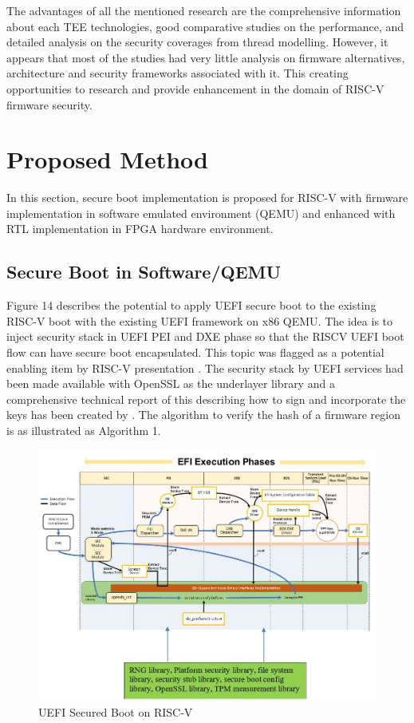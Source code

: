 \documentclass[review]{elsarticle}
\begin{document}
The advantages of all the mentioned research are the comprehensive information about each TEE technologies, good comparative studies on the performance, and detailed analysis on the security coverages from thread modelling. However, it appears that most of the studies had very little analysis on firmware alternatives, architecture and security frameworks associated with it. This creating opportunities to research and provide enhancement in the domain of RISC-V firmware security.

\section{ Proposed Method}
In this section, secure boot implementation is proposed for RISC-V with firmware implementation in software emulated environment (QEMU) and enhanced with RTL implementation in FPGA hardware environment.


\subsection{ Secure Boot in Software/QEMU}
Figure 14 describes the potential to apply UEFI secure boot to the existing RISC-V boot with the existing UEFI framework on x86 QEMU. The idea is to inject security stack in UEFI PEI and DXE phase so that the RISCV UEFI boot flow can have secure boot encapsulated. This topic was flagged as a potential enabling item by RISC-V presentation \cite{R5:10}. The security stack by UEFI services had been made available with OpenSSL as the underlayer library and a comprehensive technical report of this describing how to sign and incorporate the keys has been created by \cite{R5:11}. The algorithm to verify the hash of a firmware region is as illustrated as Algorithm 1.


\begin{figure}[hbt!]
	\centering
	\includegraphics[width=1\textwidth]{figs/SecureBootOnRISCV.JPG}
	\caption{UEFI Secured Boot on RISC-V}
\end{figure}
\end{document}
